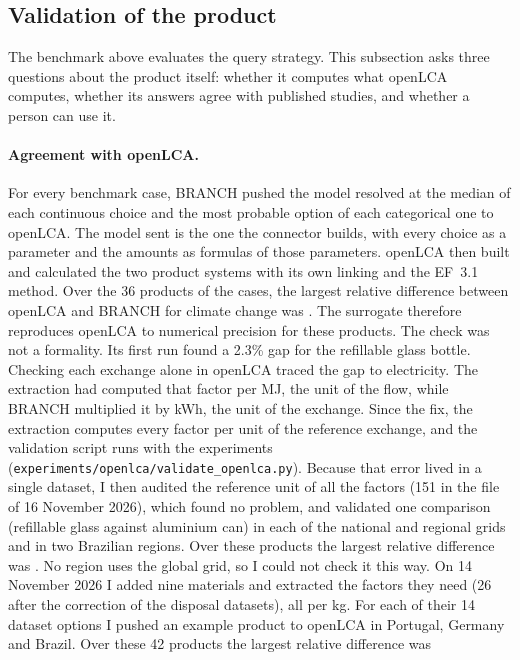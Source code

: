 \documentclass{article}
\begin{document}
\subsection{Validation of the product}\label{sec:validation}

The benchmark above evaluates the query strategy. This subsection asks three questions about the product
itself: whether it computes what openLCA computes, whether its answers agree with published studies, and
whether a person can use it.

\paragraph{Agreement with openLCA.}
For every benchmark case, BRANCH pushed the model resolved at the median of each continuous choice and
the most probable option of each categorical one to openLCA. The model sent is the one the connector builds, with every choice as a parameter and the amounts as formulas of those parameters. openLCA then built and calculated the two product systems with its own linking and the EF~3.1
method. Over the 36 products of the \nCases{} cases, the largest relative difference between openLCA and
BRANCH for climate change was \maxDiffBench{}. The surrogate therefore reproduces openLCA to numerical
precision for these products. The check was not a formality. Its first run found a 2.3\% gap for the refillable glass bottle.
Checking each exchange alone in openLCA traced the gap to electricity. The extraction had computed that
factor per MJ, the unit of the flow, while BRANCH multiplied it by kWh, the unit of the exchange. Since the
fix, the extraction computes every factor per unit of the reference exchange, and the validation script runs with
the experiments (\texttt{experiments/openlca/validate\_openlca.py}). Because that error lived in a single dataset, I then
audited the reference unit of all the factors (151 in the file of 16 November 2026), which found no problem, and validated one comparison
(refillable glass against aluminium can) in each of the \nGrids{} national and regional grids and in two
Brazilian regions. Over these \nGridProducts{} products the largest relative difference was
\maxDiffGrids{}. No region uses the global grid, so I could not check it this way. On 14 November 2026 I added nine
materials and extracted the factors they need (26 after the correction of the disposal datasets), all per kg. For each of their 14 dataset options I pushed an example
product to openLCA in Portugal, Germany and Brazil. Over these 42 products the largest relative difference was
\end{document}
